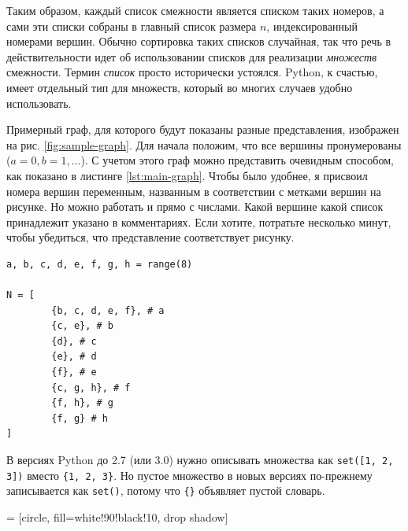 Таким образом, каждый список смежности является списком таких номеров, а сами эти списки собраны в главный список размера $n$, индексированный номерами вершин. Обычно сортировка таких списков случайная, так что речь в действительности идет об использовании списков для реализации \textit{множеств} смежности. Термин \textit{список} просто исторически устоялся. Python, к счастью, имеет отдельный тип для множеств, который во многих случаев удобно использовать.

Примерный граф, для которого будут показаны разные представления, изображен на рис. \ref{fig:sample-graph}. Для начала положим, что все вершины пронумерованы ($a=0, b =1, \ldots$). С учетом этого граф можно представить очевидным способом, как показано в листинге \ref{lst:main-graph}. Чтобы было удобнее, я присвоил номера вершин переменным, названным в соответствии с метками вершин на рисунке. Но можно работать и прямо с числами. Какой вершине какой список принадлежит указано в комментариях. Если хотите, потратьте несколько минут, чтобы убедиться, что представление соответствует рисунку.

\begin{lstlisting}[caption={Простая реализация представления в виде множеств смежности}, label={lst:main-graph}]
a, b, c, d, e, f, g, h = range(8)

N = [
		{b, c, d, e, f}, # a
		{c, e}, # b
		{d}, # c
		{e}, # d
		{f}, # e
		{c, g, h}, # f
		{f, h}, # g
		{f, g} # h
]
\end{lstlisting}

\begin{note}
В версиях Python до 2.7 (или 3.0) нужно описывать множества как \texttt{set([1, 2, 3])} вместо \texttt{\{1, 2, 3\}}. Но пустое множество в новых версиях по-прежнему записывается как \texttt{set()}, потому что \texttt{\{\}} объявляет пустой словарь.
\end{note}


 = [circle,
						fill=white!90!black!10,
						drop shadow]

